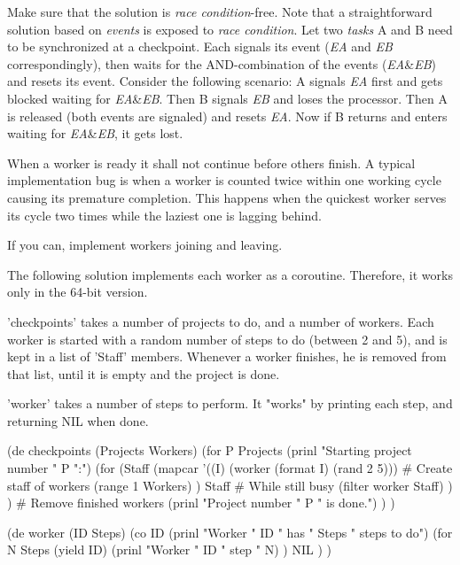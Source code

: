 Make sure that the solution is \emph{race condition}-free. Note that a
straightforward solution based on \emph{events} is exposed to
\emph{race condition}. Let two \emph{tasks} A and B need to be
synchronized at a checkpoint. Each signals its event (\emph{EA} and
\emph{EB} correspondingly), then waits for the AND-combination of the
events (\emph{EA}\&\emph{EB}) and resets its event. Consider the
following scenario: A signals \emph{EA} first and gets blocked waiting
for \emph{EA}\&\emph{EB}. Then B signals \emph{EB} and loses the
processor. Then A is released (both events are signaled) and resets
\emph{EA}. Now if B returns and enters waiting for
\emph{EA}\&\emph{EB}, it gets lost.

When a worker is ready it shall not continue before others finish. A
typical implementation bug is when a worker is counted twice within one
working cycle causing its premature completion. This happens when the
quickest worker serves its cycle two times while the laziest one is
lagging behind.

If you can, implement workers joining and leaving.

\begin{wideverbatim}

The following solution implements each worker as a coroutine. Therefore, it
works only in the 64-bit version.

'checkpoints' takes a number of projects to do, and a number of workers. Each
worker is started with a random number of steps to do (between 2 and 5), and is
kept in a list of 'Staff' members. Whenever a worker finishes, he is removed
from that list, until it is empty and the project is done.

'worker' takes a number of steps to perform. It "works" by printing each step,
and returning NIL when done.

(de checkpoints (Projects Workers)
   (for P Projects
      (prinl "Starting project number " P ":")
      (for
         (Staff
            (mapcar
               '((I) (worker (format I) (rand 2 5)))  # Create staff of workers
               (range 1 Workers) )
            Staff                                     # While still busy
            (filter worker Staff) ) )                 # Remove finished workers
      (prinl "Project number " P " is done.") ) )

(de worker (ID Steps)
   (co ID
      (prinl "Worker " ID " has " Steps " steps to do")
      (for N Steps
         (yield ID)
         (prinl "Worker " ID " step " N) )
      NIL ) )

\end{wideverbatim}


